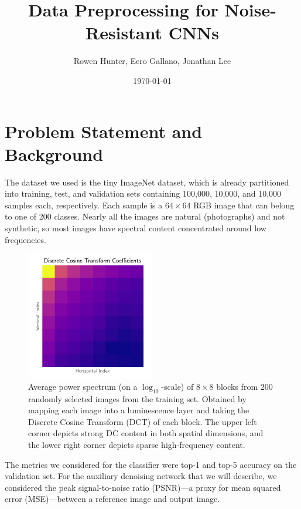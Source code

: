 \documentclass[justified]{article}
\begin{document}
  \title{Data Preprocessing for Noise-Resistant CNNs}
  \author{Rowen Hunter, Eero Gallano, Jonathan Lee}
  \date{\today}
  \maketitle

  \section{Problem Statement and Background}

  The dataset we used is the tiny ImageNet dataset, which is already partitioned into training, test, and validation sets containing 100,000, 10,000, and 10,000 samples each, respectively.
  Each sample is a $64 \times 64$ RGB image that can belong to one of 200 classes.
  Nearly all the images are natural (photographs) and not synthetic, so most images have spectral content concentrated around low frequencies.

  \begin{figure}[H]
    \centering
    \includegraphics[width=0.5\textwidth]{figures/dct}
    \caption{
      Average power spectrum (on a $\log_{10}$-scale) of $8 \times 8$ blocks from 200 randomly selected images from the training set.
      Obtained by mapping each image into a luminescence layer and taking the Discrete Cosine Transform (DCT) of each block.
      The upper left corner depicts strong DC content in both spatial dimensions, and the lower right corner depicts sparse high-frequency content.
    }
  \end{figure}

  The metrics we considered for the classifier were top-1 and top-5 accuracy on the validation set.
  For the auxiliary denoising network that we will describe, we considered the peak signal-to-noise ratio (PSNR)---a proxy for mean squared error (MSE)---between a reference image and output image.
\end{document}
